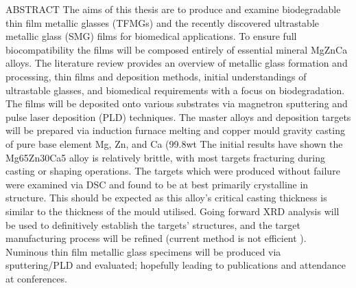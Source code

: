 ABSTRACT 
The aims of this thesis are to produce and examine biodegradable thin film metallic glasses (TFMGs) and the recently discovered ultrastable metallic glass (SMG) films for biomedical applications. To ensure full biocompatibility the films will be composed entirely of essential mineral MgZnCa alloys.
The literature review provides an overview of metallic glass formation and processing, thin films and deposition methods, initial understandings of ultrastable glasses, and biomedical requirements with a focus on biodegradation. 
The films will be deposited onto various substrates via magnetron sputtering and pulse laser deposition (PLD) techniques. The master alloys and deposition targets will be prepared via induction furnace melting and copper mould gravity casting of pure base element Mg, Zn, and Ca (99.8wt%
The initial results have shown the Mg65Zn30Ca5 alloy is relatively brittle, with most targets fracturing during casting or shaping operations. The targets which were produced without failure were examined via DSC and found to be at best primarily crystalline in structure. This should be expected as this alloy’s critical casting thickness is similar to the thickness of the mould utilised. 
Going forward XRD analysis will be used to definitively establish the targets’ structures, and the target manufacturing process will be refined (current method is not efficient ). Numinous thin film metallic glass specimens will be produced via sputtering/PLD and evaluated; hopefully leading to publications and attendance at conferences. 

